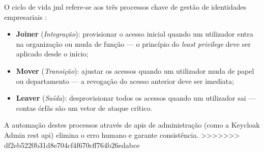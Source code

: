 O ciclo de vida \gls{jml} refere-se aos três processos chave de gestão de identidades empresariais \cite{IDPro}:

\begin{itemize}
  \item \textbf{Joiner} (\textit{Integração}): provisionar o acesso inicial quando um utilizador entra na organização ou muda de função — o princípio do \textit{least privilege} deve ser aplicado desde o início;
  \item \textbf{Mover} (\textit{Transição}): ajustar os acessos quando um utilizador muda de papel ou departamento — a revogação do acesso anterior deve ser imediata;
  \item \textbf{Leaver} (\textit{Saída}): desprovisionar todos os acessos quando um utilizador sai — contas órfãs são um vetor de ataque crítico.
\end{itemize}

A automação destes processos através de \gls{api}s de administração (como a Keycloak Admin \gls{rest} \gls{api}) elimina o erro humano e garante consistência.
>>>>>>> df2eb5220b31d8e704cf4f670cff764b26edabce
